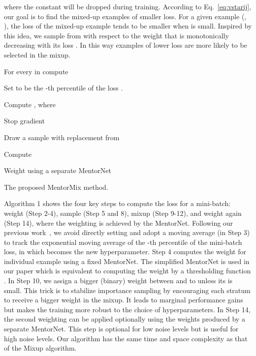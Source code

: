 \documentclass{article}
\begin{document}
where the constant  will be dropped during training. According to Eq.~\eqref{eq:vstarij}, our goal is to find the mixed-up examples of smaller loss. For a given example (, ), the loss of the mixed-up example  tends to be smaller when  is small. Inspired by this idea, we sample  from  with respect to the weight  that is monotonically decreasing with its loss  . In this way examples of lower loss are more likely to be selected in the mixup.

{
\begin{algorithm}
\small
{}
\LinesNumbered
{}

For every  in  compute  \;

Set  to be the -th percentile of the loss . \;

 \; {\footnotesize{}}

  \; {\footnotesize{}}

Compute , where  \;

Stop gradient \;

\ForEach{ } {
    Draw a sample  with replacement from   \;
    
     \;
    
      \;
    


     \;
    
     \;
    
    Compute  \;
    
    Weight  using a separate MentorNet \; {\footnotesize{}}
}
\Return 
\caption{{The proposed MentorMix method.}}
\label{alg:overall}
\end{algorithm}
\vspace{-1mm}
}

Algorithm 1 shows the four key steps to compute the loss for a mini-batch: weight (Step 2-4), sample (Step 5 and 8), mixup (Step 9-12), and weight again (Step 14), where the weighting is achieved by the MentorNet. Following our previous work~\citep{jiang2018mentornet}, we avoid directly setting  and adopt a moving average (in Step 3) to track the exponential moving average of the -th percentile of the mini-batch loss, in which  becomes the new hyperparameter. Step 4 computes the weight for individual example using a fixed MentorNet. The simplified MentorNet is used in our paper which is equivalent to computing the weight by a thresholding function . In Step 10, we assign a bigger (binary) weight between  and  to  unless its  is small. 
This trick is to stabilize importance sampling by encouraging each stratum to receive a bigger weight in the mixup. It leads to marginal performance gains but makes the training more robust to the choice of hyperparameters. In Step 14, the second weighting can be applied optionally using the weights produced by a separate MentorNet. This step is optional for low noise levels but is useful for high noise levels. Our algorithm has the same time and space complexity as that of the Mixup algorithm.
\end{document}
